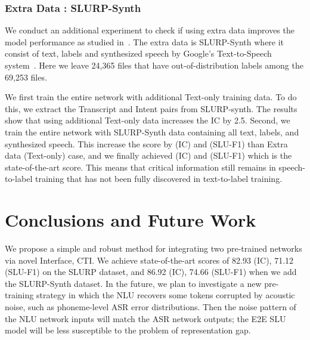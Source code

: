 \documentclass{article}
\begin{document}
\vspace{-4mm}
\subsubsection{Extra Data : SLURP-Synth}
We conduct an additional experiment to check if using extra data improves the model performance as studied in~\cite{lugosch2020using}.
The extra data is SLURP-Synth where it consist of text, labels and synthesized speech by Google’s Text-to-Speech system~\cite{bastianelli2020slurp}. 
Here we leave 24,365 files that have out-of-distribution labels among the 69,253 files.


We first train the entire network with additional Text-only training data. To do this, we extract the Transcript and Intent pairs from SLURP-synth.
The results show that using additional Text-only data increases the IC by 2.5.
Second, we train the entire network with SLURP-Synth data containing all text, labels, and synthesized speech.
This increase the score by  (IC) and  (SLU-F1) than Extra data (Text-only) case, and we finally achieved  (IC) and  (SLU-F1) which is the state-of-the-art score.
This means that critical information still remains in speech-to-label training that has not been fully discovered in text-to-label training.





\vspace{-2mm}
\section{Conclusions and Future Work}
We propose a simple and robust method for integrating two pre-trained networks via novel Interface, CTI. 
We achieve state-of-the-art scores of 82.93 (IC), 71.12 (SLU-F1) on the SLURP dataset, and 86.92 (IC), 74.66 (SLU-F1) when we add the SLURP-Synth dataset.
In the future, we plan to investigate a new pre-training strategy in which the NLU recovers some tokens corrupted by acoustic noise, such as phoneme-level ASR error distributions.
Then the noise pattern of the NLU network inputs will match the ASR network outputs; the E2E SLU model will be less susceptible to the problem of representation gap.

\clearpage




\let\OLDthebibliography\thebibliography
\renewcommand\thebibliography[1]{
  \OLDthebibliography{#1}
  \setlength{\parskip}{0pt}
  \setlength{\itemsep}{0pt plus 0.4ex}
}



\end{document}
